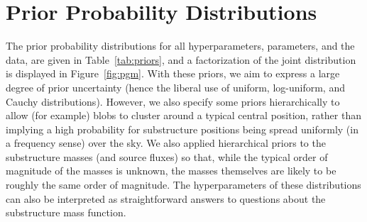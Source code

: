\documentclass[useAMS,usenatbib]{mn2e}
\begin{document}
\section{Prior Probability Distributions}\label{sec:priors}
The prior probability distributions for all hyperparameters, parameters, and
the data, are given in Table~\ref{tab:priors}, and a factorization of the
joint distribution is displayed in Figure~\ref{fig:pgm}. With these priors,
we aim to express a large degree of prior uncertainty (hence the liberal use
of uniform, log-uniform, and Cauchy distributions). However, we also specify
some priors hierarchically to allow (for example)
blobs to cluster around a typical central
position, rather than implying a high probability for substructure positions
being spread uniformly (in a frequency sense) over the sky. We also applied
hierarchical priors to the substructure masses (and source fluxes) so that, while
the typical order of magnitude of the masses is unknown, the masses
themselves are likely to be roughly the same order of magnitude. The
hyperparameters of these distributions can also be interpreted as
straightforward answers to questions about the substructure mass function.
\end{document}
